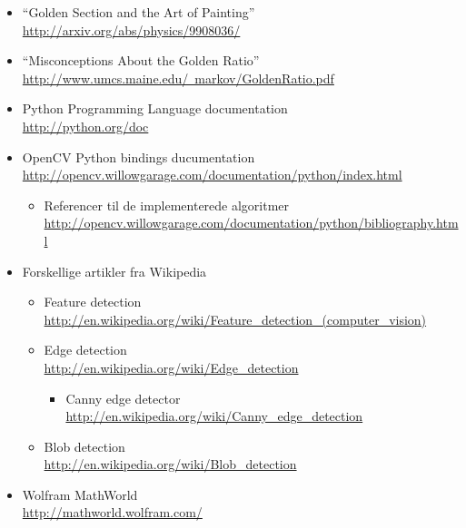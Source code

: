 \begin{itemize}
	\item ``Golden Section and the Art of Painting''\\
		\href{http://arxiv.org/abs/physics/9908036/}{http://arxiv.org/abs/physics/9908036/}
	\item ``Misconceptions About the Golden Ratio''\\
		\href{http://www.umcs.maine.edu/~markov/GoldenRatio.pdf}{http://www.umcs.maine.edu/~markov/GoldenRatio.pdf}
	\item Python Programming Language documentation\\
		\href{http://python.org/doc}{http://python.org/doc}
	\item OpenCV Python bindings ducumentation\\
		\href{http://opencv.willowgarage.com/documentation/python/index.html}{http://opencv.willowgarage.com/documentation/python/index.html}
		\begin{itemize}
			\item Referencer til de implementerede algoritmer\\
				\href{http://opencv.willowgarage.com/documentation/python/bibliography.html}{http://opencv.willowgarage.com/documentation/python/bibliography.html}
		\end{itemize}
	\item Forskellige artikler fra Wikipedia\\
		\begin{itemize}
			\item Feature detection\\
				\href{http://en.wikipedia.org/wiki/Feature\_detection\_(computer\_vision)}{http://en.wikipedia.org/wiki/Feature\_detection\_(computer\_vision)}\\
			\item Edge detection\\
				\href{http://en.wikipedia.org/wiki/Edge\_detection}{http://en.wikipedia.org/wiki/Edge\_detection}
					\begin{itemize}
						\item Canny edge detector\\
							\href{http://en.wikipedia.org/wiki/Canny\_edge\_detection}{http://en.wikipedia.org/wiki/Canny\_edge\_detection}
					\end{itemize}
			\item Blob detection\\
				\href{http://en.wikipedia.org/wiki/Blob\_detection}{http://en.wikipedia.org/wiki/Blob\_detection}
		\end{itemize}
	\item Wolfram MathWorld\\
		\href{http://mathworld.wolfram.com/}{http://mathworld.wolfram.com/}
\end{itemize}
